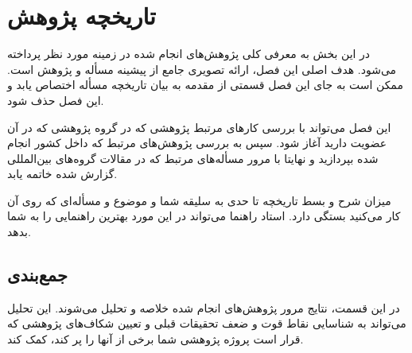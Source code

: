 \chapter{تاریخچه پژوهش}

در این بخش به معرفی کلی پژوهش‌های انجام شده در زمینه مورد نظر پرداخته می‌شود. هدف اصلی این فصل، ارائه تصویری جامع از پیشینه مسأله و پژوهش است. ممکن است به جای این فصل قسمتی از مقدمه به بیان تاریخچه مسأله اختصاص یابد و این فصل حذف شود.

این فصل می‌تواند با بررسی کارهای مرتبط پژوهشی که در گروه پژوهشی که در آن عضویت دارید آغاز شود. سپس به بررسی پژوهش‌های مرتبط که داخل کشور انجام شده بپردازید و نهایتا با مرور مسأله‌های مرتبط که در مقالات گروه‌های بین‌المللی گزارش شده خاتمه یابد.

میزان شرح و بسط تاریخچه تا حدی به سلیقه شما و موضوع و مسأله‌ای که روی آن کار می‌کنید بستگی دارد. استاد راهنما می‌تواند در این مورد بهترین راهنمایی را به شما بدهد.

\section{جمع‌بندی}
در این قسمت، نتایج مرور پژوهش‌های انجام شده خلاصه و تحلیل می‌شوند. این تحلیل می‌تواند به شناسایی نقاط قوت و ضعف تحقیقات قبلی و تعیین شکاف‌های پژوهشی که قرار است پروژه پژوهشی شما برخی از آنها را پر کند، کمک کند.

